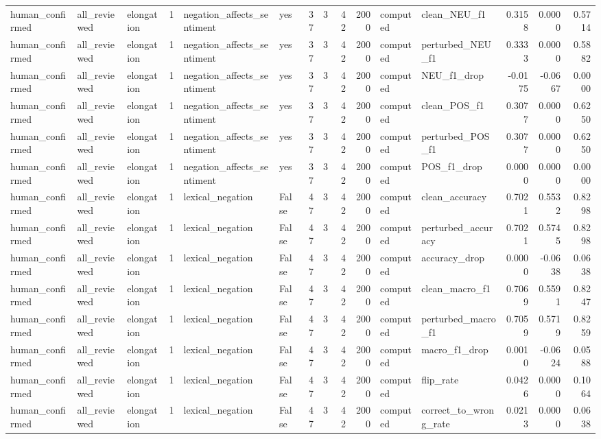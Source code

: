 \begin{tabular}{lllrllrrrrllrrr}
human_confirmed & all_reviewed & elongation & 1 & negation_affects_sentiment & yes & 37 & 3 & 42 & 2000 & computed & clean_NEU_f1 & 0.3158 & 0.0000 & 0.5714 \\
human_confirmed & all_reviewed & elongation & 1 & negation_affects_sentiment & yes & 37 & 3 & 42 & 2000 & computed & perturbed_NEU_f1 & 0.3333 & 0.0000 & 0.5882 \\
human_confirmed & all_reviewed & elongation & 1 & negation_affects_sentiment & yes & 37 & 3 & 42 & 2000 & computed & NEU_f1_drop & -0.0175 & -0.0667 & 0.0000 \\
human_confirmed & all_reviewed & elongation & 1 & negation_affects_sentiment & yes & 37 & 3 & 42 & 2000 & computed & clean_POS_f1 & 0.3077 & 0.0000 & 0.6250 \\
human_confirmed & all_reviewed & elongation & 1 & negation_affects_sentiment & yes & 37 & 3 & 42 & 2000 & computed & perturbed_POS_f1 & 0.3077 & 0.0000 & 0.6250 \\
human_confirmed & all_reviewed & elongation & 1 & negation_affects_sentiment & yes & 37 & 3 & 42 & 2000 & computed & POS_f1_drop & 0.0000 & 0.0000 & 0.0000 \\
human_confirmed & all_reviewed & elongation & 1 & lexical_negation & False & 47 & 3 & 42 & 2000 & computed & clean_accuracy & 0.7021 & 0.5532 & 0.8298 \\
human_confirmed & all_reviewed & elongation & 1 & lexical_negation & False & 47 & 3 & 42 & 2000 & computed & perturbed_accuracy & 0.7021 & 0.5745 & 0.8298 \\
human_confirmed & all_reviewed & elongation & 1 & lexical_negation & False & 47 & 3 & 42 & 2000 & computed & accuracy_drop & 0.0000 & -0.0638 & 0.0638 \\
human_confirmed & all_reviewed & elongation & 1 & lexical_negation & False & 47 & 3 & 42 & 2000 & computed & clean_macro_f1 & 0.7069 & 0.5591 & 0.8247 \\
human_confirmed & all_reviewed & elongation & 1 & lexical_negation & False & 47 & 3 & 42 & 2000 & computed & perturbed_macro_f1 & 0.7059 & 0.5719 & 0.8259 \\
human_confirmed & all_reviewed & elongation & 1 & lexical_negation & False & 47 & 3 & 42 & 2000 & computed & macro_f1_drop & 0.0010 & -0.0624 & 0.0588 \\
human_confirmed & all_reviewed & elongation & 1 & lexical_negation & False & 47 & 3 & 42 & 2000 & computed & flip_rate & 0.0426 & 0.0000 & 0.1064 \\
human_confirmed & all_reviewed & elongation & 1 & lexical_negation & False & 47 & 3 & 42 & 2000 & computed & correct_to_wrong_rate & 0.0213 & 0.0000 & 0.0638 \\

\end{tabular}
